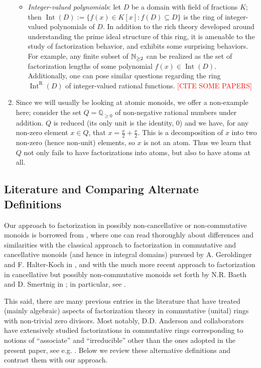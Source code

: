 \begin{eg}
\begin{enumerate}[label={\rm (\roman{*})}]
\begin{itemize}
\item \textit{Integer-valued polynomials}: let $D$ be a domain with field of fractions $K$; then $\operatorname{Int}(D) := \{f(x) \in K[x]: f(D) \subseteq D \}$ is the ring of integer-valued polynomials of $D$.
In addition to the rich theory developed around understanding the prime ideal structure of this ring, it is amenable to the study of factorization behavior, and exhibits some surprising behaviors.  
For example, any finite subset of $\mathbb{N}_{\ge2}$ can be realized as the set of factorization lengths of some polynomial $f(x)\in \operatorname{Int}(D)$.
Additionally, one can pose similar questions regarding the ring $\operatorname{Int}^\text{R}(D)$ of integer-valued rational functions. \textcolor{red}{[CITE SOME PAPERS]}
\end{itemize}
\item Since we will usually be looking at atomic monoids, we offer a non-example here; consider the set $Q = \mathbb{Q}_{\ge 0}$ of non-negative rational numbers under addition.
$Q$ is reduced (its only unit is the identity, $0$) and we have, for any non-zero element $x\in Q$, that $x = \frac{x}{2} + \frac{x}{2}$.
This is a decomposition of $x$ into two non-zero (hence non-unit) elements, so $x$ is not an atom.
Thus we learn that $Q$ not only fails to have factorizations into atoms, but also to have atoms at all.
\end{enumerate}
\end{eg}

\subsection{Literature and Comparing Alternate Definitions}
\label{sub:other-factorizations}
%
Our approach to factorization in possibly non-cancellative or non-commutative monoids is borrowed from \cite{fan-tringali18}, where one can read thoroughly about differences and similarities with 
the classical approach to factorization in commutative and cancellative monoids (and hence in integral domains) pursued by A. Geroldinger and F. Halter-Koch in \cite{geroldinger-hk06}, and with the much more recent approach to factorization in cancellative but possibly non-commutative monoids set forth by N.R. Baeth and D. Smertnig in \cite{baeth-smertnig15}; in particular, see \cite[Remarks 2.6 and 2.7]{fan-tringali18}.

This said, there are many previous entries in the literature that have treated (mainly algebraic) aspects of factorization theory in commutative (unital) rings with non-trivial zero divisors. Most notably, D.D. Anderson and collaborators have extensively studied factorizations in commutative rings corresponding to notions of ``associate'' and ``irreducible'' other than the ones adopted in the present paper, see e.g. \cite{AndMar85a,AndMar85b,AnVL96,AnVL97,AgAnVL01,ChunAnd11,ChAnVLe11}. Below we review these alternative definitions and contrast them with our approach. 

